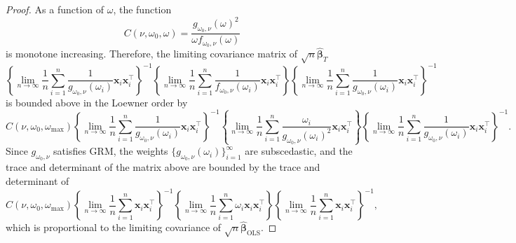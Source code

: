 \documentclass[12pt]{article}
\newcommand{\bl}[1]{{\mathbf #1}}
\newcommand{\bs}[1]{\boldsymbol #1}
\begin{document}
\begin{proof}
    As a function of $\omega$, the function
    \begin{equation*}
        C(\nu, \omega_0, \omega) =\frac{g_{\omega_0, \nu}(\omega)^2}{\omega f_{\omega_0, \nu}(\omega)}
    \end{equation*}
    is monotone increasing. Therefore, the limiting covariance matrix of $\sqrt{n}\hat{\bs{\beta}}_T$
    \begin{equation*}
        \left\{ \lim_{n \rightarrow \infty} \frac{1}{n} \sum_{i=1}^n \frac{1}{g_{\omega_0, \nu}(\omega_i)} \bl{x}_i \bl{x}_i^\top \right\}^{-1} \left\{ \lim_{n \rightarrow \infty} \frac{1}{n} \sum_{i=1}^n \frac{1}{f_{\omega_0, \nu}(\omega_i)} \bl{x}_i \bl{x}_i^\top \right\} \left\{ \lim_{n \rightarrow \infty} \frac{1}{n} \sum_{i=1}^n \frac{1}{g_{\omega_0, \nu}(\omega_i)} \bl{x}_i \bl{x}_i^\top \right\}^{-1}
    \end{equation*}
    is bounded above in the Loewner order by
    \small{\begin{equation*}
        C(\nu, \omega_0, \omega_{\max})\left\{ \lim_{n \rightarrow \infty} \frac{1}{n} \sum_{i=1}^n \frac{1}{g_{\omega_0, \nu}(\omega_i)} \bl{x}_i \bl{x}_i^\top \right\}^{-1} \left\{ \lim_{n \rightarrow \infty} \frac{1}{n} \sum_{i=1}^n \frac{\omega_i}{g_{\omega_0, \nu}(\omega_i)^2} \bl{x}_i \bl{x}_i^\top \right\} \left\{ \lim_{n \rightarrow \infty} \frac{1}{n} \sum_{i=1}^n \frac{1}{g_{\omega_0, \nu}(\omega_i)} \bl{x}_i \bl{x}_i^\top \right\}^{-1}.
    \end{equation*}}
    Since $g_{\omega_0, \nu}$ satisfies GRM, the weights $\{g_{\omega_0, \nu}(\omega_i)\}_{i=1}^\infty$ are subscedastic, and the trace and determinant of the matrix above are bounded by the trace and determinant of
    \begin{equation*}
        C(\nu, \omega_0, \omega_{\max})\left\{ \lim_{n \rightarrow \infty} \frac{1}{n} \sum_{i=1}^n \bl{x}_i \bl{x}_i^\top \right\}^{-1} \left\{ \lim_{n \rightarrow \infty} \frac{1}{n} \sum_{i=1}^n \omega_i \bl{x}_i \bl{x}_i^\top \right\} \left\{ \lim_{n \rightarrow \infty} \frac{1}{n} \sum_{i=1}^n \bl{x}_i \bl{x}_i^\top \right\}^{-1},
    \end{equation*}
    which is proportional to the limiting covariance of $\sqrt{n}\hat{\bs{\beta}}_{\mathrm{OLS}}$.

\end{proof}
\end{document}
